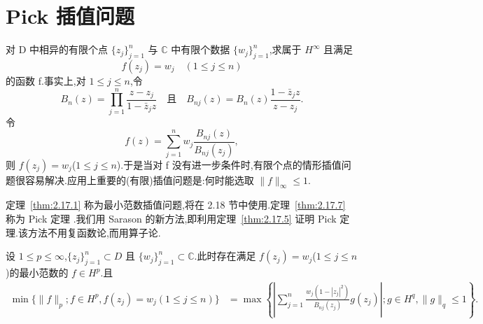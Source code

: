 \section{Pick 插值问题}\label{sec:2.17}


对 D 中相异的有限个点 $\{z_{j}\}_{j=1}^{n}$ 与 $\mathbb{C}$ 中有限个数据 $\{w_{j}\}_{j=1}^{n}$,求属于 $H^{\infty}$ 且满足
\begin{equation*}
f(z_{j}) = w_{j} \quad (1 \leq j \leq n)
\end{equation*}
的函数 f.事实上,对 $1 \leq j \leq n$,令
\begin{equation*}
B_{n}(z) = \prod_{j=1}^{n} \frac{z - z_{j}}{1 - \bar{z}_{j}z} \quad \text{且} \quad B_{nj}(z) = B_{n}(z)\frac{1 - \bar{z}_{j}z}{z - z_{j}}.
\end{equation*}
令
\begin{equation*}
f(z) = \sum_{j=1}^{n} w_{j}\frac{B_{nj}(z)}{B_{nj}(z_{j})},
\end{equation*}
则 $f(z_{j}) = w_{j}$($1 \leq j \leq n$).于是当对 f 没有进一步条件时,有限个点的情形插值问题很容易解决.应用上重要的(有限)插值问题是:何时能选取 $\|f\|_{\infty} \leq 1$.

定理~\ref{thm:2.17.1} 称为最小范数插值问题,将在 2.18 节中使用.定理~\ref{thm:2.17.7} 称为 Pick 定理 \cite{ch2:14}.我们用 Sarason 的新方法,即利用定理~\ref{thm:2.17.5} 证明 Pick 定理.该方法不用复函数论,而用算子论.

\begin{theorem}\label{thm:2.17.1}
设 $1 \leq p \leq \infty$,$\{z_{j}\}_{j=1}^{n} \subset D$ 且 $\{w_{j}\}_{j=1}^{n} \subset \mathbb{C}$.此时存在满足 $f(z_{j}) = w_{j}$($1 \leq j \leq n$)的最小范数的 $f \in H^{p}$.且
\begin{align*}
\min \{\|f\|_{p}; f \in H^{p}, f(z_{j}) = w_{j} (1 \leq j \leq n)\}&= \max \left\{\left| \sum_{j=1}^{n} \frac{w_{j}(1 - |z_{j}|^{2})}{B_{nj}(z_{j})} g(z_{j}) \right|; g \in H^{q}, \|g\|_{q} \leq 1 \right\}.
 \end{align*}
\end{theorem}

